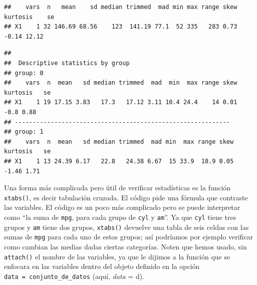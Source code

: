 \documentclass[
]{article}
\newenvironment{Shaded}{\begin{snugshade}}{\end{snugshade}}
\newcommand{\CommentTok}[1]{\textcolor[rgb]{0.56,0.35,0.01}{\textit{#1}}}
\newcommand{\FunctionTok}[1]{\textcolor[rgb]{0.13,0.29,0.53}{\textbf{#1}}}
\newcommand{\NormalTok}[1]{#1}
\newcommand{\SpecialCharTok}[1]{\textcolor[rgb]{0.81,0.36,0.00}{\textbf{#1}}}
\begin{document}
\begin{Shaded}
\end{Shaded}

\begin{verbatim}
##    vars  n   mean    sd median trimmed  mad min max range skew kurtosis    se
## X1    1 32 146.69 68.56    123  141.19 77.1  52 335   283 0.73    -0.14 12.12
\end{verbatim}

\begin{Shaded}
\end{Shaded}

\begin{verbatim}
## 
##  Descriptive statistics by group 
## group: 0
##    vars  n  mean   sd median trimmed  mad  min  max range skew kurtosis   se
## X1    1 19 17.15 3.83   17.3   17.12 3.11 10.4 24.4    14 0.01     -0.8 0.88
## ------------------------------------------------------------ 
## group: 1
##    vars  n  mean   sd median trimmed  mad min  max range skew kurtosis   se
## X1    1 13 24.39 6.17   22.8   24.38 6.67  15 33.9  18.9 0.05    -1.46 1.71
\end{verbatim}

Una forma más complicada pero útil de verificar estadísticas es la
función \texttt{xtabs()}, es decir tabulación cruzada. El código pide
una fórmula que contraste las variables. El código es un poco más
complicado pero se puede interpretar como ``la suma de \texttt{mpg},
para cada grupo de \texttt{cyl} y \texttt{am}''. Ya que \texttt{cyl}
tiene tres grupos y \texttt{am} tiene dos grupos, \texttt{xtabs()}
devuelve una tabla de seis celdas con las sumas de \texttt{mpg} para
cada uno de estos grupos; así podríamos por ejemplo verificar como
cambian las medias dadas ciertas categorías. Noten que hemos usado, sin
\texttt{attach()} el nombre de las variables, ya que le dijimos a la
función que se enfocara en las variables dentro del objeto definido en
la opción \texttt{data\ =\ conjunto\_de\_datos} (aquí, \emph{data} = d).
\end{document}
